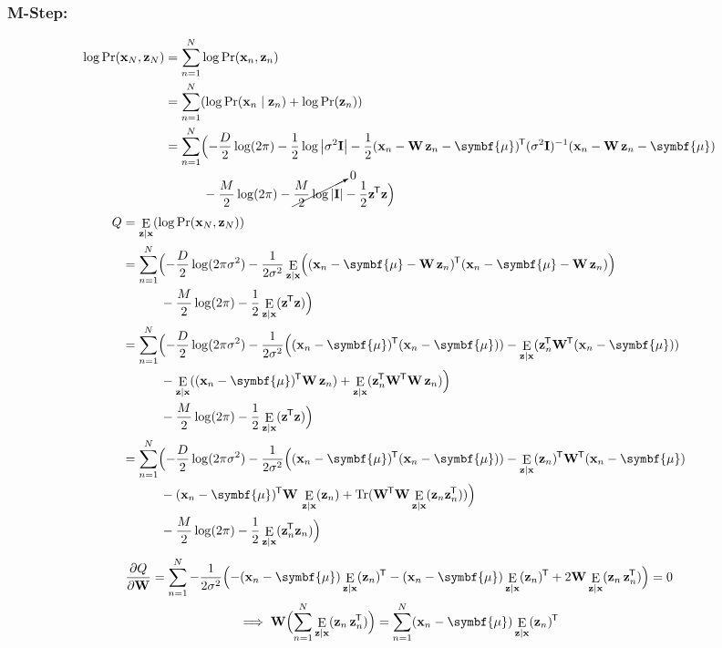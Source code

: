 \documentclass[11pt]{article}
\DeclareMathOperator{\E}{E}
\DeclareMathOperator{\Tr}{Tr}
\newcommand{\logdet}[1]{\log \left| {#1} \right| }
\newcommand{\xb}{\mathbf{x}}
\newcommand{\zb}{\mathbf{z}}
\newcommand{\ub}{\symbf{\mu}}
\newcommand{\Wb}{\mathbf{W}}
\newcommand*{\tran}{^{\mkern-1.5mu\mathsf{T}}}
\begin{document}
\subsubsection*{M-Step:}
\begin{align*}
  \log \Pr({\xb}_N, {\zb}_N) &= \sum_{n=1}^N \log\Pr(\xb_n, \zb_n) \\
  &= \sum_{n=1}^N (\log\Pr(\xb_n \mid \zb_n) + \log\Pr(\zb_n)) \\
  &= \sum_{n=1}^N \Bigl(
    -\frac{D}{2}\log(2\pi) -\frac{1}{2}\logdet{\sigma^2 \mathbf{I}}
    -\frac{1}{2}(\xb_n - \Wb\, \zb_n - \ub)\tran (\sigma^2 \mathbf{I})^{-1}
            (\xb_n - \Wb\, \zb_n - \ub) \\
  &\quad\qquad -\frac{M}{2}\log(2\pi) -\cancelto{0}{\frac{M}{2}\logdet{\mathbf{I}}}
    -\frac{1}{2}\zb\tran \zb \Bigr)
\end{align*}
\begin{align*}
  Q &= \E_{\zb\mid\xb} (\log \Pr({\xb}_N, {\zb}_N)) \\
  &= \sum_{n=1}^N \Bigl(
    -\frac{D}{2}\log(2\pi \sigma^2)
    -\frac{1}{2 \sigma^2} \E_{\zb\mid\xb}\Bigl((\xb_n - \ub - \Wb\, \zb_n )\tran
          (\xb_n - \ub - \Wb\, \zb_n)\Bigr) \\
  &\quad \qquad -\frac{M}{2}\log(2\pi) -\frac{1}{2}\E_{\zb\mid\xb}(\zb\tran \zb) \Bigr) \\
  &= \sum_{n=1}^N \Bigl(-\frac{D}{2}\log(2\pi \sigma^2)
    -\frac{1}{2 \sigma^2} \Bigl((\xb_n - \ub)\tran(\xb_n - \ub))
    -\E_{\zb\mid\xb}(\zb_n\tran \Wb\tran (\xb_n - \ub)) \\
  &\quad \qquad  -\E_{\zb\mid\xb}((\xb_n - \ub)\tran \Wb\, \zb_n)
    +\E_{\zb\mid\xb}(\zb_n\tran \Wb\tran \Wb\, \zb_n)\Bigr) \\
  &\quad \qquad -\frac{M}{2}\log(2\pi) -\frac{1}{2}\E_{\zb\mid\xb}(\zb\tran \zb) \Bigr) \\
  &= \sum_{n=1}^N \Bigl(-\frac{D}{2}\log(2\pi \sigma^2)
    -\frac{1}{2 \sigma^2} \Bigl((\xb_n - \ub)\tran(\xb_n - \ub))
    -\E_{\zb\mid\xb}(\zb_n)\tran \Wb\tran (\xb_n - \ub) \\
  &\quad \qquad  -(\xb_n - \ub)\tran \Wb\, \E_{\zb\mid\xb}(\zb_n)
    +\Tr(\Wb\tran \Wb\E_{\zb\mid\xb}(\zb_n \zb_n\tran))\Bigr) \\
  &\quad \qquad -\frac{M}{2}\log(2\pi) -\frac{1}{2}\E_{\zb\mid\xb}(\zb_n\tran \zb_n) \Bigr) \\
\end{align*}
\begin{gather*}
  \frac{\partial Q}{\partial \Wb} =
  \sum_{n=1}^N -\frac{1}{2 \sigma^2}\Bigl(
    -(\xb_n - \ub) \E_{\zb\mid\xb}(\zb_n) \tran
    -(\xb_n - \ub) \E_{\zb\mid\xb}(\zb_n) \tran
    + 2 \Wb \E_{\zb\mid\xb}(\zb_n\, \zb_n\tran) \Bigr) = 0 \\
  \implies \Wb \Bigl(\sum_{n=1}^N \E_{\zb\mid\xb}(\zb_n\, \zb_n\tran) \Bigr) =
  \sum_{n=1}^N (\xb_n - \ub) \E_{\zb\mid\xb}(\zb_n) \tran
\end{gather*}
\end{document}
